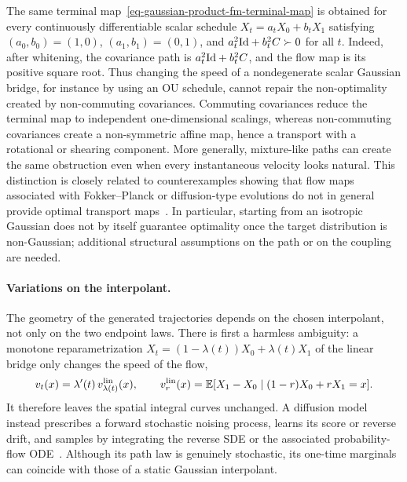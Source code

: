 \begin{rem}
	The same terminal map~\eqref{eq-gaussian-product-fm-terminal-map} is obtained for every continuously differentiable scalar schedule $X_t=a_tX_0+b_tX_1$ satisfying $(a_0,b_0)=(1,0)$, $(a_1,b_1)=(0,1)$, and $a_t^2\mathrm{Id}+b_t^2C\succ0$ for all $t$. Indeed, after whitening, the covariance path is $a_t^2\mathrm{Id}+b_t^2C$, and the flow map is its positive square root. Thus changing the speed of a nondegenerate scalar Gaussian bridge, for instance by using an OU schedule, cannot repair the non-optimality created by non-commuting covariances.
	Commuting covariances reduce the terminal map to independent one-dimensional scalings, whereas non-commuting covariances create a non-symmetric affine map, hence a transport with a rotational or shearing component. More generally, mixture-like paths can create the same obstruction even when every instantaneous velocity looks natural. This distinction is closely related to counterexamples showing that flow maps associated with Fokker--Planck or diffusion-type evolutions do not in general provide optimal transport maps~\citep{LavenantSantambrogio2022FlowMap}. In particular, starting from an isotropic Gaussian does not by itself guarantee optimality once the target distribution is non-Gaussian; additional structural assumptions on the path or on the coupling are needed.
\end{rem}

\paragraph{Variations on the interpolant.}

The geometry of the generated trajectories depends on the chosen interpolant, not only on the two endpoint laws. There is first a harmless ambiguity: a monotone reparametrization $X_t=(1-\lambda(t))X_0+\lambda(t)X_1$ of the linear bridge only changes the speed of the flow,
\[
	v_t(x)=\lambda'(t)\,v^{\rm lin}_{\lambda(t)}(x),
	\qquad
	v^{\rm lin}_{r}(x)=\mathbb{E}[X_1-X_0\mid (1-r)X_0+rX_1=x].
\]
It therefore leaves the spatial integral curves unchanged. A diffusion model instead prescribes a forward stochastic noising process, learns its score or reverse drift, and samples by integrating the reverse SDE or the associated probability-flow ODE~\citep{Song2021ScoreSDE}. Although its path law is genuinely stochastic, its one-time marginals can coincide with those of a static Gaussian interpolant.

